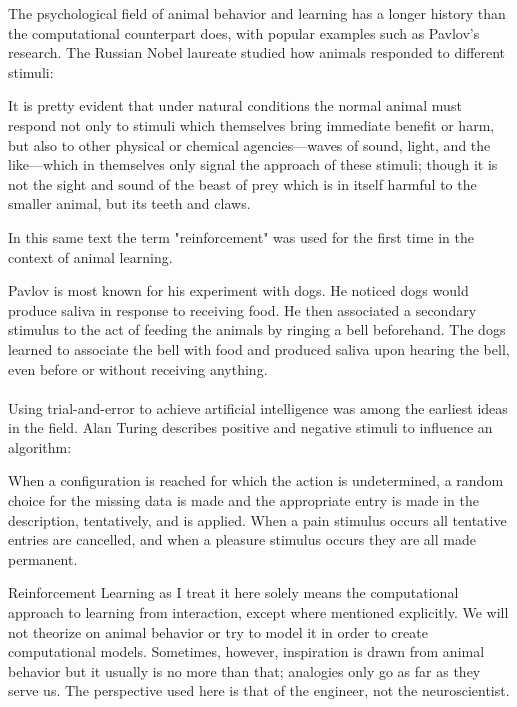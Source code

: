 The psychological field of animal behavior and learning
has a longer history than the computational counterpart does,
with popular examples such as Pavlov's research.
The Russian Nobel laureate studied how animals
responded to different stimuli:

\begin{displayquote}
It is pretty evident that under natural conditions the normal animal must
respond not only to stimuli which themselves bring immediate benefit or harm,
but also to other physical or chemical agencies—waves of sound,
light, and the like—which in themselves only signal the approach of these stimuli;
though it is not the sight and sound of the beast of prey 
which is in itself harmful to the smaller animal, but its teeth and claws.
\end{displayquote}

In this same text the term "reinforcement"
was used for the first time in the context of animal learning.

Pavlov is most known for his experiment with dogs.
He noticed dogs would produce saliva in response
to receiving food.
He then associated a secondary stimulus to the act
of feeding the animals
by ringing a bell beforehand.
The dogs learned to associate the bell
with food and produced saliva
upon hearing the bell,
even before or without receiving anything.

\paragraph{}
Using trial-and-error to achieve artificial intelligence 
was among the earliest ideas in the field.
Alan Turing describes positive and negative stimuli
to influence an algorithm:

\begin{displayquote}
  When a configuration is reached for which the action is undetermined, a
random choice for the missing data is made and the appropriate entry is
made in the description, tentatively, and is applied. When a pain stimulus
occurs all tentative entries are cancelled, and when a pleasure stimulus
occurs they are all made permanent.

\end{displayquote}

Reinforcement Learning as I treat it here
solely means the computational approach
to learning from interaction,
except where mentioned explicitly.
We will not theorize on animal behavior
or try to model it in order to create computational models.
Sometimes, however,
inspiration is drawn from animal behavior
but it usually is no more than that;
analogies only go as far as they serve us.
The perspective used here is that of the engineer,
not the neuroscientist.

